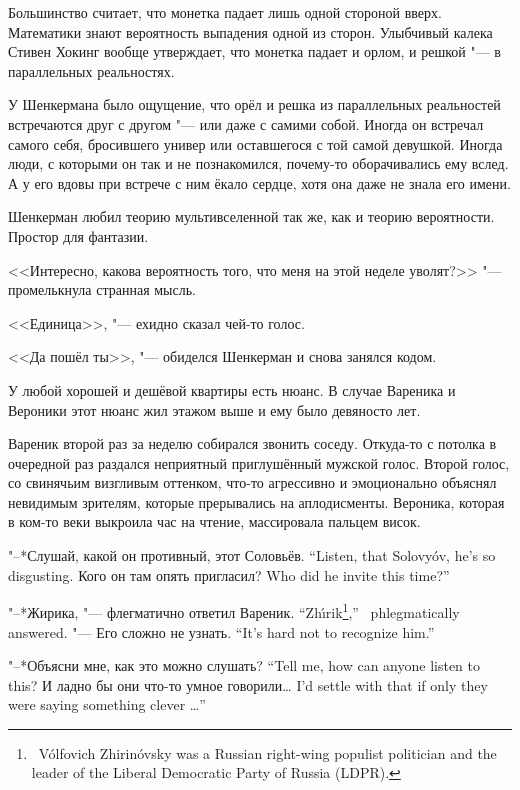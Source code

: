 Большинство считает, что монетка падает лишь одной стороной вверх.
Математики знают вероятность выпадения одной из сторон.
Улыбчивый калека Стивен Хокинг вообще утверждает, что монетка падает и орлом, и решкой "--- в параллельных реальностях.

У Шенкермана было ощущение, что орёл и решка из параллельных реальностей встречаются друг с другом "--- или даже с самими собой.
Иногда он встречал самого себя, бросившего универ или оставшегося с той самой девушкой.
Иногда люди, с которыми он так и не познакомился, почему-то оборачивались ему вслед.
А у его вдовы при встрече с ним ёкало сердце, хотя она даже не знала его имени.

Шенкерман любил теорию мультивселенной так же, как и теорию вероятности.
Простор для фантазии.

<<Интересно, какова вероятность того, что меня на этой неделе уволят?>> "--- промелькнула странная мысль.

<<Единица>>, "--- ехидно сказал чей-то голос.

<<Да пошёл ты>>, "--- обиделся Шенкерман и снова занялся кодом.

\asterism

У любой хорошей и дешёвой квартиры есть нюанс.
В случае Вареника и Вероники этот нюанс жил этажом выше и ему было девяносто лет.

Вареник второй раз за неделю собирался звонить соседу.
Откуда-то с потолка в очередной раз раздался неприятный приглушённый мужской голос.
Второй голос, со свинячьим визгливым оттенком, что-то агрессивно и эмоционально объяснял невидимым зрителям, которые прерывались на аплодисменты.
Вероника, которая в ком-то веки выкроила час на чтение, массировала пальцем висок.

{"--*Слушай, какой он противный, этот Соловьёв.}
{``Listen, that Solovy\'ov, he's so disgusting.}
{Кого он там опять пригласил?}
{Who did he invite this time?''}

{"--*Жирика, "--- флегматично ответил Вареник.}
{``Zh\'{\i}rik\footnote{\Vladimir\ V\'olfovich Zhirin\'ovsky was a Russian right-wing populist politician and the leader of the Liberal Democratic Party of Russia (LDPR).},'' \Varenik\ phlegmatically answered.}
{"--- Его сложно не узнать.}
{``It's hard not to recognize him.''}

{"--*Объясни мне, как это можно слушать?}
{``Tell me, how can anyone listen to this?}
{И ладно бы они что-то умное говорили\ldots{}}
{I'd settle with that if only they were saying something clever \ldots{}''}

